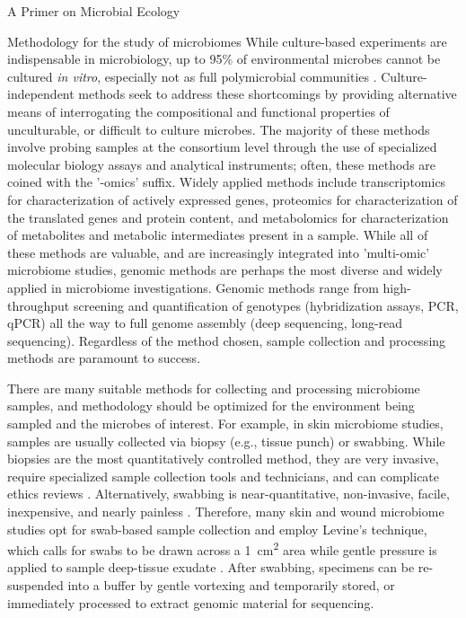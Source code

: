 \documentclass[oneside,12pt,final]{sty/ucthesis-CA2012}
\begin{document}
\begin{mainmatter}
\begin{section}{A Primer on Microbial Ecology}
\begin{subsection}{Methodology for the study of microbiomes}
While culture-based experiments are indispensable in microbiology, up to 95\% of environmental microbes cannot be cultured \textit{in vitro}, especially not as full polymicrobial communities \cite{RN86, RN125}. Culture-independent methods seek to address these shortcomings by providing alternative means of interrogating the compositional and functional properties of unculturable, or difficult to culture microbes. The majority of these methods involve probing samples at the consortium level through the use of specialized molecular biology assays and analytical instruments; often, these methods are coined with the '-omics' suffix. Widely applied methods include transcriptomics for characterization of actively expressed genes, proteomics for characterization of the translated genes and protein content, and metabolomics for characterization of metabolites and metabolic intermediates present in a sample. While all of these methods are valuable, and are increasingly integrated into 'multi-omic' microbiome studies, genomic methods are perhaps the most diverse and widely applied in microbiome investigations. Genomic methods range from high-throughput screening and quantification of genotypes (hybridization assays, PCR, qPCR) all the way to full genome assembly (deep sequencing, long-read sequencing). Regardless of the method chosen, sample collection and processing methods are paramount to success.

There are many suitable methods for collecting and processing microbiome samples, and methodology should be optimized for the environment being sampled and the microbes of interest. For example, in skin microbiome studies, samples are usually collected via biopsy (e.g., tissue punch) or swabbing. While biopsies are the most quantitatively controlled method, they are very invasive, require specialized sample collection tools and technicians, and can complicate ethics reviews \cite{RN87}. Alternatively, swabbing is near-quantitative, non-invasive, facile, inexpensive, and nearly painless \cite{RN88}. Therefore, many skin and wound microbiome studies opt for swab-based sample collection and employ Levine's technique, which calls for swabs to be drawn across a \SI{1}{\centi\meter\squared} area while gentle pressure is applied to sample deep-tissue exudate \cite{RN37}. After swabbing, specimens can be re-suspended into a buffer by gentle vortexing and temporarily stored, or immediately processed to extract genomic material for sequencing.


\end{subsection}
\end{section}
\end{mainmatter}
\end{document}
